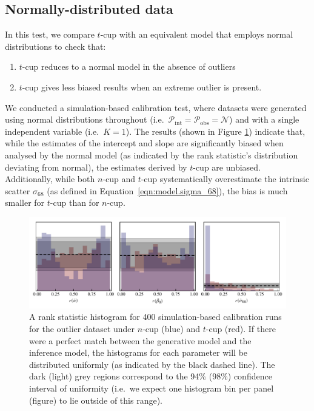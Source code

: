 \documentclass[fleqn,usenatbib]{rasti}
\begin{document}
\subsection{Normally-distributed data}
\label{sec:results.outlier}

In this test, we compare $t$-cup with an equivalent model that employs normal
distributions to check that:
\begin{enumerate}
    \item $t$-cup reduces to a normal model in the absence of outliers
    \item $t$-cup gives less biased results when an extreme outlier is present.
\end{enumerate}

We conducted a simulation-based calibration test, where datasets were generated
using normal distributions throughout (i.e.\ $\mathcal P_{\text{int}} = \mathcal
P_{\text{obs}} = \mathcal{N}$) and with a single independent variable (i.e.\ $K
= 1$). The results (shown in Figure \ref{fig:results.outlier.sbc}) indicate
that, while the estimates of the intercept and slope are significantly biased
when analysed by the normal model (as indicated by the rank statistic's
distribution deviating from normal), the estimates derived by $t$-cup are
unbiased. Additionally, while both $n$-cup and $t$-cup systematically
overestimate the intrinsic scatter $\sigma_{68}$ (as defined in
Equation~\ref{eqn:model.sigma_68}), the bias is much smaller for $t$-cup than
for $n$-cup.


\begin{figure}
    \includegraphics[width=\textwidth]{graphics/sbc/outlier20_sbc.pdf}
    \caption{A rank statistic histogram for 400 simulation-based calibration
    runs for the outlier dataset under $n$-cup (blue) and $t$-cup (red). If
    there were a perfect match between the generative model and the inference
    model, the histograms for each parameter will be distributed uniformly (as
    indicated by the black dashed line). The dark (light) grey regions
    correspond to the 94\% (98\%) confidence interval of uniformity (i.e.\ we
    expect one histogram bin per panel (figure) to lie outside of this range).}
    \label{fig:results.outlier.sbc}
\end{figure}
\end{document}
